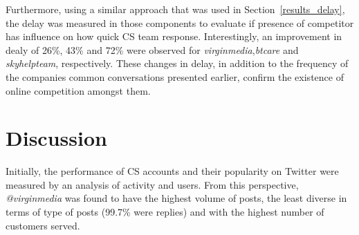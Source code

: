 \documentclass[sigconf]{acmart}
\begin{document}
{Furthermore, using a similar approach that was used in
Section~\ref{results_delay}, the delay was measured in those
components to evaluate if presence of competitor has influence on how
quick CS team response. Interestingly, an improvement in dealy of 26\%, 43\%
and 72\% were observed for {\emph{virginmedia}},{\emph{btcare}} and
{\emph{skyhelpteam}}, respectively. These changes in delay, in addition to
the frequency of the companies common conversations presented earlier, 
confirm the existence of online competition amongst them.






\section{Discussion}\label{discussion}

Initially, the performance of CS accounts and their popularity on
Twitter were measured by an analysis of activity and users. From this
perspective, {\emph{@virginmedia}} was found to have the highest
volume of posts, the least diverse in terms of type of posts (99.7\%
were replies) and with the highest number of customers served.

}
\end{document}
